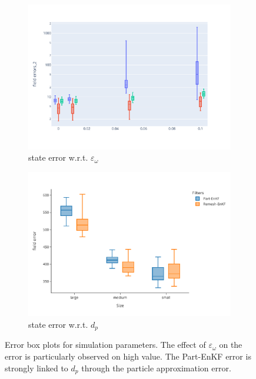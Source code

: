 \begin{figure}[htbp]
	\centering

	\begin{subfigure}{0.48\textwidth}
		\centering
		\includegraphics[width=\linewidth]{./images/app2d/MSE_eps_omega_box.pdf}
		\captionsetup{labelformat=empty}
		\caption{state error w.r.t. $\varepsilon_{\omega}$}
		\label{fig:eps_omega}
	\end{subfigure}
	\hfill
	\begin{subfigure}{0.48\textwidth}
		\centering
		\includegraphics[width=\linewidth]{./images/app2d/final/MSE_size_box.pdf}
		\captionsetup{labelformat=empty}
		\caption{state error w.r.t. $d_p$}
		\label{fig:np_visc}
	\end{subfigure}

	\caption{Error box plots for simulation parameters. The effect of $\varepsilon_{\omega}$ on the error is particularly observed on high value. The Part-EnKF error is strongly linked to $d_p$ through the particle approximation error.}
	\label{fig:simu_parameters_error}
\end{figure}

